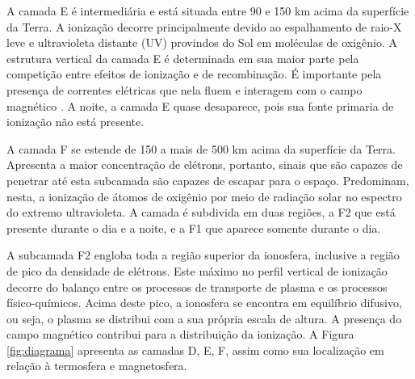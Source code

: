 A camada E é intermediária e está situada entre 90 e 150 km acima da superfície da Terra. A ionização decorre principalmente devido ao espalhamento de raio-X leve e ultravioleta distante (UV) provindos do Sol em moléculas de oxigênio. A estrutura vertical da camada E é determinada em sua maior parte pela competição entre efeitos de ionização e de recombinação. É importante pela presença de correntes elétricas que nela fluem e interagem com o campo magnético \cite{KIRCHHOFF:1991}. A noite, a camada E quase desaparece, pois sua fonte primaria de ionização não está presente.

A camada F se estende de 150 a mais de 500 km acima da superfície da Terra. Apresenta a maior concentração de elétrons, portanto, sinais que são capazes de penetrar até esta subcamada são capazes de escapar para o espaço. Predominam, nesta, a ionização de átomos de oxigênio por meio de radiação solar no espectro do extremo ultravioleta. A camada é subdivida em duas regiões, a F2 que está presente durante o dia e a noite, e a F1 que aparece somente durante o dia. 

A subcamada F2 engloba toda a região superior da ionosfera, inclusive a região de pico da densidade de elétrons. Este máximo no perfil vertical de ionização decorre do balanço entre os processos de transporte de plasma e os processos físico-químicos. Acima deste pico, a ionosfera se encontra em equilíbrio difusivo, ou seja, o plasma se distribui com a sua própria escala de altura. A presença do campo magnético contribui para a distribuição da ionização. A Figura \ref{fig:diagrama} apresenta as camadas D, E, F, assim como sua localização em relação à termosfera e magnetosfera.

